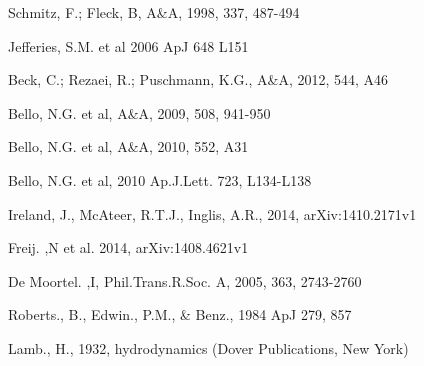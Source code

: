 \documentclass{aa}
\begin{document}
\begin{thebibliography}{}
 Schmitz, F.; Fleck, B, A\&A, 1998, 337, 487-494

 Jefferies, S.M. et al 2006 ApJ  648 L151

 Beck, C.; Rezaei, R.; Puschmann, K.G., A\&A, 2012, 544, A46

 Bello, N.G. et al, A\&A, 2009, 508, 941-950

 Bello, N.G. et al, A\&A, 2010, 552, A31

 Bello, N.G. et al, 2010 Ap.J.Lett. 723, L134-L138

 Ireland, J., McAteer, R.T.J., Inglis, A.R., 2014, arXiv:1410.2171v1

 Freij. ,N et al. 2014, arXiv:1408.4621v1

 De Moortel. ,I, Phil.Trans.R.Soc. A, 2005, 363, 2743-2760

 Roberts., B., Edwin., P.M., \& Benz.,  1984 ApJ  279, 857

 Lamb., H.,  1932, hydrodynamics (Dover Publications, New York)

\end{thebibliography}
\end{document}
